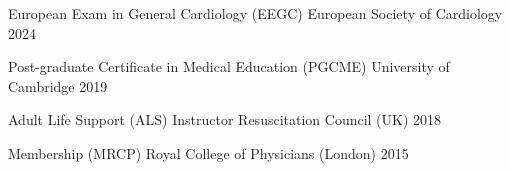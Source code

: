 


\begin{cvhonors}
  \cvhonor
    {European Exam in General Cardiology (EEGC)} %
    {European Society of Cardiology} %
    {} %
    {2024} %

  \cvhonor
    {Post-graduate Certificate in Medical Education (PGCME)} %
    {University of Cambridge} %
    {} %
    {2019} %

  \cvhonor
    {Adult Life Support (ALS) Instructor} %
    {Resuscitation Council (UK)} %
    {} %
    {2018} %
    
  \cvhonor
    {Membership (MRCP)} %
    {Royal College of Physicians (London)} %
    {} %
    {2015} %
  
\end{cvhonors}
